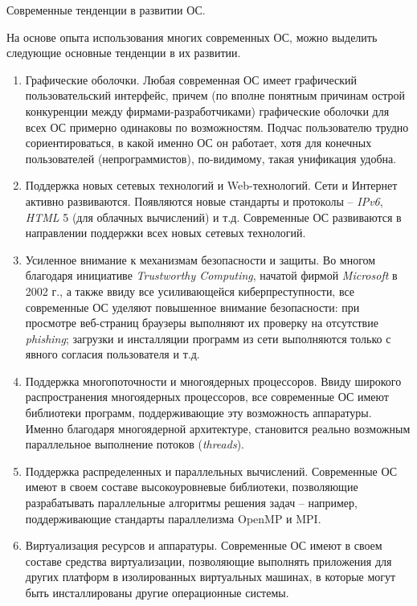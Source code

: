Современные тенденции в развитии ОС.

На основе опыта использования многих современных ОС, можно выделить следующие основные тенденции в их развитии.
\begin{enumerate}
	
	\item Графические оболочки. Любая современная ОС имеет графический пользовательский интерфейс, причем (по вполне понятным причинам острой конкуренции между фирмами-разработчиками) графические оболочки для всех ОС примерно одинаковы по возможностям. Подчас пользователю трудно сориентироваться, в какой именно ОС он работает, хотя для конечных пользователей (непрограммистов), по-видимому, такая унификация удобна.
	
	\item Поддержка новых сетевых технологий и Web-технологий. Сети и Интернет активно развиваются. Появляются новые стандарты и протоколы – \textit{IPv6}, \textit{HTML} 5 (для облачных вычислений) и т.д. Современные ОС развиваются в направлении поддержки всех новых сетевых технологий.
	
	\item Усиленное внимание к механизмам безопасности и защиты. Во многом благодаря инициативе \textit{Trustworthy Computing}, начатой фирмой \textit{Microsoft} в 2002 г., а также ввиду все усиливающейся киберпреступности, все современные ОС уделяют повышенное внимание безопасности: при просмотре веб-страниц браузеры выполняют их проверку на отсутствие \textit{phishing}; загрузки и инсталляции программ из сети выполняются только с явного согласия пользователя и т.д.
	
	\item Поддержка многопоточности и многоядерных процессоров. Ввиду широкого распространения многоядерных процессоров, все современные ОС имеют библиотеки программ, поддерживающие эту возможность аппаратуры. Именно благодаря многоядерной архитектуре, становится реально возможным параллельное выполнение потоков (\textit{threads}).
	
	\item Поддержка распределенных и параллельных вычислений. Современные ОС имеют в своем составе высокоуровневые библиотеки, позволяющие разрабатывать параллельные алгоритмы решения задач – например, поддерживающие стандарты параллелизма OpenMP и MPI.
	
	\item Виртуализация ресурсов и аппаратуры. Современные ОС имеют в своем составе средства виртуализации, позволяющие выполнять приложения для других платформ в изолированных виртуальных машинах, в которые могут быть инсталлированы другие операционные системы.
	

\end{enumerate}
